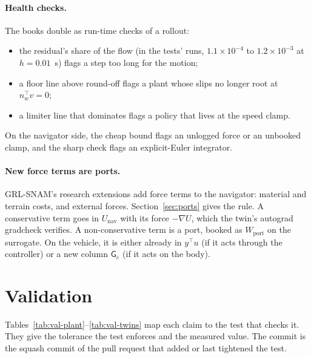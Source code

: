 \documentclass[11pt]{article}
\theoremstyle{remark}
\newcommand{\G}{\mathsf G}
\newcommand{\T}{^{\top}}
\begin{document}
\paragraph{Health checks.} The books double as run-time checks of a rollout:
\begin{itemize}
  \item the residual's share of the flow (in the tests' runs, $1.1\times10^{-4}$ to
        $1.2\times10^{-3}$ at $h=0.01$~s) flags a step too long for the motion;
  \item a floor line above round-off flags a plant whose slips no longer root at $n_w\T v=0$;
  \item a limiter line that dominates flags a policy that lives at the speed clamp.
\end{itemize}
On the navigator side, the cheap bound flags an unlogged force or an unbooked clamp, and the sharp
check flags an explicit-Euler integrator.

\paragraph{New force terms are ports.} GRL-SNAM's research extensions add force terms to the
navigator: material and terrain costs, and external forces. Section~\ref{sec:ports} gives the rule.
A conservative term goes in $U_{\mathrm{nav}}$ with its force $-\nabla U$, which the twin's
autograd gradcheck verifies. A non-conservative term is a port, booked as $W_{\mathrm{port}}$ on
the surrogate. On the vehicle, it is either already in $y\T u$ (if it acts through the controller)
or a new column $\G_e$ (if it acts on the body).

\section{Validation}
\label{sec:validation}

Tables~\ref{tab:val-plant}--\ref{tab:val-twins} map each claim to the test that checks it. They give
the tolerance the test enforces and the measured value. The commit is the squash commit of the
pull request that added or last tightened the test.
\end{document}
